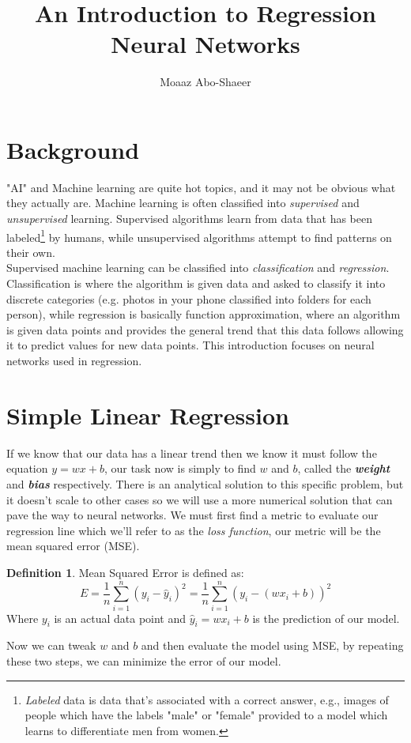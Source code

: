 \documentclass[a4paper]{article}
\title{An Introduction to Regression Neural Networks}
\author{Moaaz Abo-Shaeer}
\date{}
\theoremstyle{definition}
\newtheorem{definition}{Definition}
\begin{document}
\maketitle

\section{Background}
"AI" and Machine learning are quite hot topics, and it may not be obvious what they actually are. Machine learning is often classified into \textit{supervised} and \textit{unsupervised} learning.
Supervised algorithms learn from data that has been labeled\footnote{\textit{Labeled} data is data that's associated with a correct answer, e.g., images of people which have the labels "male" or "female" provided to a model which learns to differentiate men from women.} by humans, while unsupervised algorithms attempt to find patterns on their own.\\
Supervised machine learning can be classified into \textit{classification} and \textit{regression}.
Classification is where the algorithm is given data and asked to classify it into discrete categories (e.g. photos in your phone classified into folders for each person), while regression is basically function approximation, where an algorithm is given data points and provides the general trend that this data follows allowing it to predict values for new data points.
This introduction focuses on neural networks used in regression.

\section{Simple Linear Regression}
If we know that our data has a linear trend then we know it must follow the equation $y = wx + b$, our task now is simply to find $w$ and $b$, called the \textbf{\textit{weight}} and \textbf{\textit{bias}} respectively.
There is an analytical solution to this specific problem, but it doesn't scale to other cases so we will use a more numerical solution that can pave the way to neural networks.
We must first find a metric to evaluate our regression line which we'll refer to as the \textit{loss function}, our metric will be the mean squared error (MSE).

\begin{definition}{Mean Squared Error}
    is defined as:
    \begin{equation*}
        E = \frac{1}{n} \sum_{i=1}^{n} (y_i - \hat{y}_i)^2 = \frac{1}{n} \sum_{i=1}^{n} (y_i - (wx_i + b))^2
    \end{equation*}
    Where $y_i$ is an actual data point and $\hat{y}_i = wx_i + b$ is the prediction of our model.
\end{definition}
\noindent
Now we can tweak $w$ and $b$ and then evaluate the model using MSE, by repeating these two steps, we can minimize the error of our model.
\end{document}
